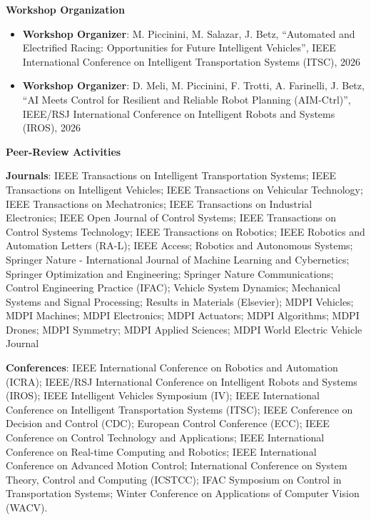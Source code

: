 \documentclass{article}
\begin{document}
\vspace{0.2cm}
\begin{center}
\Large\textbf{Workshop Organization}
\end{center}

\begin{itemize}
    \item \textbf{Workshop Organizer}: M. Piccinini, M. Salazar, J. Betz, ``Automated and Electrified Racing: Opportunities for Future Intelligent Vehicles'', IEEE International Conference on Intelligent Transportation Systems (ITSC), 2026
    \item \textbf{Workshop Organizer}: D. Meli, M. Piccinini, F. Trotti, A. Farinelli, J. Betz, ``AI Meets Control for Resilient and Reliable Robot Planning (AIM-Ctrl)'', IEEE/RSJ International Conference on Intelligent Robots and Systems (IROS), 2026
\end{itemize}

\newpage
\begin{center}
\Large\textbf{Peer-Review Activities}
\end{center}

\vspace{0.3cm}
{\textbf{Journals}}: 
IEEE Transactions on Intelligent Transportation Systems; IEEE Transactions on Intelligent Vehicles; IEEE Transactions on Vehicular Technology; IEEE Transactions on Mechatronics; IEEE Transactions on Industrial Electronics; IEEE Open Journal of Control Systems; IEEE Transactions on Control Systems Technology; IEEE Transactions on Robotics; IEEE Robotics and Automation Letters (RA-L); IEEE Access; Robotics and Autonomous Systems; Springer Nature - International Journal of Machine Learning and Cybernetics; Springer Optimization and Engineering; Springer Nature Communications; Control Engineering Practice (IFAC); Vehicle System Dynamics; Mechanical Systems and Signal Processing; Results in Materials (Elsevier); MDPI Vehicles; MDPI Machines; MDPI Electronics; MDPI Actuators; MDPI Algorithms; MDPI Drones; MDPI Symmetry; MDPI Applied Sciences; MDPI World Electric Vehicle Journal 

\vspace{0.3cm}
{\textbf{Conferences}}: IEEE International Conference on Robotics and Automation (ICRA); IEEE/RSJ International Conference on Intelligent Robots and Systems (IROS); IEEE Intelligent Vehicles Symposium (IV); IEEE International Conference on Intelligent Transportation Systems (ITSC); IEEE Conference on Decision and Control (CDC); European Control Conference (ECC); IEEE Conference on Control Technology and Applications; IEEE International Conference on Real-time Computing and Robotics; IEEE International Conference on Advanced Motion Control; International Conference on System Theory, Control and Computing (ICSTCC); IFAC Symposium on Control in Transportation Systems; Winter Conference on Applications of Computer Vision (WACV).
\end{document}
